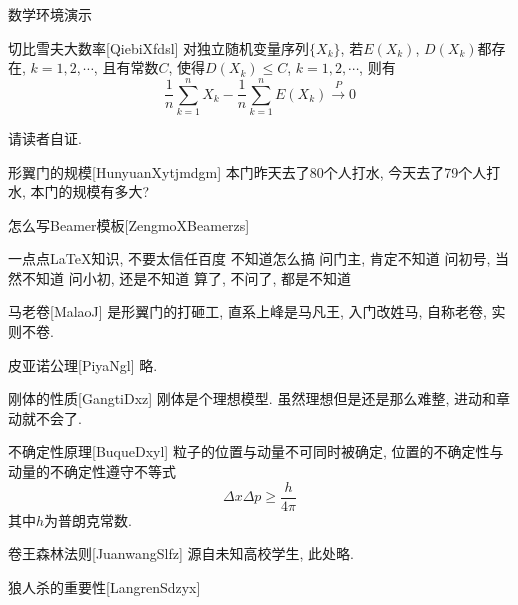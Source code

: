 \documentclass[hyperref, UTF8, CJK, aspectratio=169]{beamer}
\begin{document}
\begin{frame}{数学环境演示}
	\begin{scutheorem}{切比雪夫大数率}[QiebiXfdsl]
		对独立随机变量序列$\{X_k\}$, 若$E(X_k)$, $D(X_k)$都存在, $k=1,2,\cdots$, 且有常数$C$, 使得$D(X_k)\leq C$, $k=1,2,\cdots$, 则有
		\begin{equation}
		\dfrac{1}{n} \sum_{k=1}^{n} X_k - \dfrac{1}{n} \sum_{k=1}^{n} E(X_k) \stackrel{\;P\;}{\longrightarrow} 0
		\end{equation}
	\end{scutheorem}
	\begin{scuproof}{}
		请读者自证.
	\end{scuproof}
	\begin{scuexample}{形翼门的规模}[HunyuanXytjmdgm]
		本门昨天去了80个人打水, 今天去了79个人打水, 本门的规模有多大?
	\end{scuexample}
	\begin{scualgorithm}{怎么写Beamer模板}[ZengmoXBeamerzs]
		\begin{algorithmic}[1]
		\REQUIRE 一点点\LaTeX 知识, 不要太信任百度
		\ENSURE 不知道怎么搞
		\STATE 问门主, 肯定不知道
		\STATE 问初号, 当然不知道
		\STATE 问小初, 还是不知道
		\RETURN 算了, 不问了, 都是不知道
		\end{algorithmic}
	\end{scualgorithm}
	\begin{scudefinition}{马老卷}[MalaoJ]
		是形翼门的打砸工, 直系上峰是马凡王, 入门改姓马, 自称老卷, 实则不卷.
	\end{scudefinition}
	\begin{scuaxiom}{皮亚诺公理}[PiyaNgl]
		略.
	\end{scuaxiom}
	\begin{scuproperty}{刚体的性质}[GangtiDxz]
		刚体是个理想模型. 虽然理想但是还是那么难整, 进动和章动就不会了.
	\end{scuproperty}
	\begin{scuproposition}{不确定性原理}[BuqueDxyl]
		粒子的位置与动量不可同时被确定, 位置的不确定性与动量的不确定性遵守不等式
		\begin{equation}
			\Delta x \Delta p \geq \dfrac{h}{4\pi}
		\end{equation}
		其中$h$为普朗克常数.
	\end{scuproposition}
	\begin{sculemma}{卷王森林法则}[JuanwangSlfz]
		源自未知高校学生, 此处略.
	\end{sculemma}
	\begin{scucorollary}{狼人杀的重要性}[LangrenSdzyx]

\end{scucorollary}
\end{frame}
\end{document}
